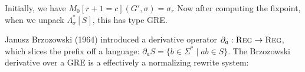 \documentclass[portrait,a0b,final,a4resizeable]{a0poster}
\def\jointspacing{\vspace{0.3in}}
\begin{document}
\begin{poster}
\begin{multicols}{2}
\hspace*{2cm}\begin{minipage}[c]{0.90\columnwidth}
Initially, we have $M_0[r+1=c](G', \sigma) = {\sigma_r}$
Now after computing the fixpoint, when we unpack $\Lambda^*_\sigma[S]$, this has type GRE.
\end{minipage}

\jointspacing


      \jointspacing

      \hspace*{2cm}\begin{minipage}[c]{0.90\columnwidth}
Janusz Brzozowski (1964) introduced a derivative operator $\partial_a: \textsc{Reg} \rightarrow \textsc{Reg}$, which slices the prefix off a language: $\partial_a S = \{b \in \Sigma^* \mid ab \in S\}$. The Brzozowski derivative over a GRE is a effectively a normalizing rewrite system:
      \end{minipage}


\end{multicols}
\end{poster}
\end{document}
